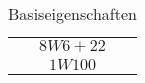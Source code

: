 \documentclass[ngerman]{article}
\begin{document}
\begin{table}
\centering
\begin{tabular}{c}
$8W6+22$\tabularnewline
$1W100$
\end{tabular}
\caption{Basiseigenschaften\label{tbl:basis}}
\end{table}
\end{document}
